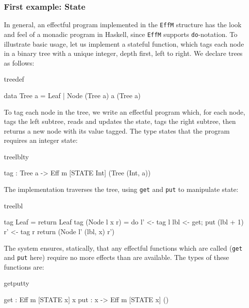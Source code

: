 \subsubsection{First example: State}

In general, an effectful program implemented in the \texttt{EffM} structure has
the look and feel of a monadic program in Haskell, since \texttt{EffM} supports
\texttt{do}-notation. To illustrate basic usage, let us implement
a stateful function, which tags each node in a binary tree with
a unique integer, depth first, left to right. We declare trees as
follows:

\begin{SaveVerbatim}{treedef}

data Tree a = Leaf 
            | Node (Tree a) a (Tree a)

\end{SaveVerbatim}

\noindent
To tag each node in the tree, we write an effectful program which, for each
node, tags the left subtree, reads and updates the state, tags the right
subtree, then returns a new node with its value tagged. The type
states that the program requires an integer state:

\begin{SaveVerbatim}{treelblty}

tag : Tree a -> Eff m [STATE Int] (Tree (Int, a))

\end{SaveVerbatim}

\noindent
The implementation traverses the tree, using \texttt{get} and \texttt{put}
to manipulate state:

\begin{SaveVerbatim}{treelbl}

tag Leaf = return Leaf
tag (Node l x r) 
     = do l' <- tag l
          lbl <- get; put (lbl + 1)
          r' <- tag r
          return (Node l' (lbl, x) r')

\end{SaveVerbatim}

\noindent
The \Eff{} system ensures, statically, that any
effectful functions which are called (\texttt{get} and \texttt{put} here)
require no more effects than are available.
The types of these functions are:

\begin{SaveVerbatim}{getputty}

get : Eff m [STATE x] x
put : x -> Eff m [STATE x] ()

\end{SaveVerbatim}

